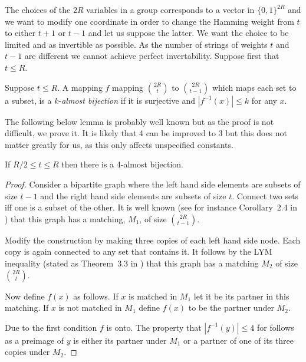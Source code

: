 \documentclass{theoretics}
\begin{document}
The choices of the $2R$ variables in
a group corresponds to a vector in $\{ 0, 1 \}^{2R}$ and
we want to modify one coordinate in order to change the Hamming
weight from $t$ to either $t+1$ or $t-1$ and let us suppose the latter.
We want the choice to be limited and as invertible
as possible.  As the number of strings of weights $t$ and
$t-1$ are different we cannot achieve perfect
invertability.   Suppose first that $t \leq R$.

\begin{definition}
Suppose $t \leq R$.  A mapping $f$ mapping 
${{2R} \choose t}$ to ${{2R} \choose {t-1}}$ which
maps each set to a subset,
is a $k$-{\em almost bijection} if
it is surjective and $| f^{-1} (x)| \leq k$ for
any $x$.  
\end{definition}

The following below lemma is probably well known but as the
proof is not difficult, we prove it.  It is likely
that 4 can be improved to 3 but this does not matter greatly for
us, as this only affects unspecified constants.

\begin{lemma}\label{lemma:restrictedchoice}
If $R/2 \leq t \leq R$ then there is a
4-almost bijection.
\end{lemma}

\begin{proof}
Consider a bipartite graph where the left
hand side elements are subsets of size $t-1$ and the right
hand side elements are subsets of size $t$.  Connect
two sets iff one is a subset of the other.  It is well
known (see for instance Corollary~2.4 in \cite{bollobas})
that this graph has
a matching, $M_1$, of size $2R \choose t-1$.

Modify the construction by making three copies of 
each left hand side node.  Each copy is again connected
to any set that contains it.  It follows by
the LYM inequality (stated as Theorem~3.3 in \cite{bollobas})
that this graph has
a matching $M_2$ of size $2R \choose t$.

Now define $f(x)$ as follows.  If $x$ is matched
in $M_1$ let it be its partner in this matching.
If $x$ is not matched in $M_1$ define $f(x)$ to be the
partner under $M_2$.

Due to the first condition $f$ is onto.  The property
that $| f^{-1} (y)| \leq 4$ for follows as
a preimage of $y$ is either its partner under $M_1$
or a partner of one of its three copies under $M_2$.
\end{proof}
\end{document}
